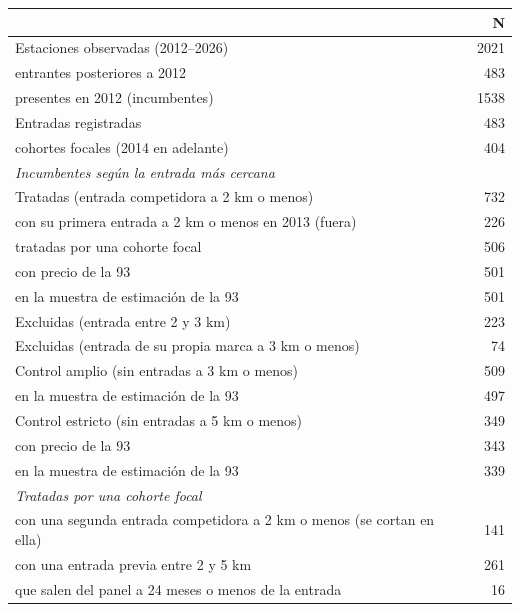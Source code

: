 \begin{tabular}{lr}
\toprule
 & N \\
\midrule
Estaciones observadas (2012--2026) & 2021 \\
\quad entrantes posteriores a 2012 & 483 \\
\quad presentes en 2012 (incumbentes) & 1538 \\
Entradas registradas & 483 \\
\quad cohortes focales (2014 en adelante) & 404 \\
\addlinespace\emph{Incumbentes según la entrada más cercana} &  \\
Tratadas (entrada competidora a 2 km o menos) & 732 \\
\quad con su primera entrada a 2 km o menos en 2013 (fuera) & 226 \\
\quad tratadas por una cohorte focal & 506 \\
\quad\quad con precio de la 93 & 501 \\
\quad\quad en la muestra de estimación de la 93 & 501 \\
Excluidas (entrada entre 2 y 3 km) & 223 \\
Excluidas (entrada de su propia marca a 3 km o menos) & 74 \\
Control amplio (sin entradas a 3 km o menos) & 509 \\
\quad en la muestra de estimación de la 93 & 497 \\
Control estricto (sin entradas a 5 km o menos) & 349 \\
\quad con precio de la 93 & 343 \\
\quad en la muestra de estimación de la 93 & 339 \\
\addlinespace\emph{Tratadas por una cohorte focal} &  \\
con una segunda entrada competidora a 2 km o menos (se cortan en ella) & 141 \\
con una entrada previa entre 2 y 5 km & 261 \\
que salen del panel a 24 meses o menos de la entrada & 16 \\
\bottomrule
\end{tabular}
